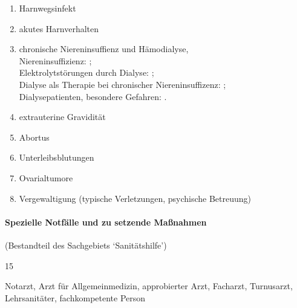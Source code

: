 \begin{enumerate}
\begin{enumerate}
      \item Harnwegsinfekt \dotfill {}
      \item akutes Harnverhalten \dotfill {}
      \item chronische Niereninsuffienz und Hämodialyse,
      \\
      Niereninsuffizienz: \dotfill {};
      \\
      Elektrolytstörungen durch
      Dialyse:  \dotfill {};
      \\
      Dialyse als Therapie bei chronischer
      Niereninsuffizenz:  \dotfill {};
      \\
      Dialysepatienten, besondere
      Gefahren:  \dotfill {}.
      \item extrauterine Gravidität \dotfill {}
      \item Abortus \dotfill {}
      \item  Unterleibsblutungen \dotfill  {}
      \item Ovarialtumore \dotfill  {}
      \item Vergewaltigung (typische Verletzungen, psychische Betreuung) \dotfill {}
    \end{enumerate}
  \end{enumerate}
  

\paragraph{Spezielle Notfälle und zu setzende Maßnahmen}
(Bestandteil des Sachgebiets  \enquote*{Sanitätshilfe})
  
  \begin{inparadesc}
    \item[Stundenanzahl:]  15
    \item[Lehrkraft:]   Notarzt, Arzt für  Allgemeinmedizin,  approbierter
    Arzt, Facharzt,   Turnusarzt,  Lehrsanitäter,  fachkompetente Person
  \end{inparadesc}
  
